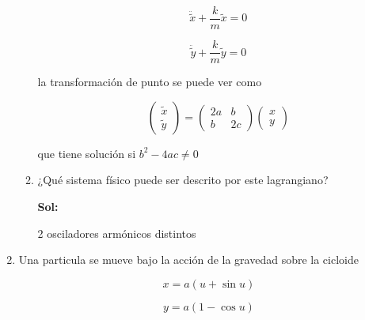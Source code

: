 \documentclass[12pt,a4paper]{article}
\begin{document}
\begin{enumerate}
\begin{enumerate}
    \begin{equation*}
        \ddot{\tilde{x}} + \frac{k}{m} \tilde{x} = 0
    \end{equation*}
    
    \begin{equation*}
        \ddot{\tilde{y}} + \frac{k}{m} \tilde{y} = 0
    \end{equation*}
    
    la transformación de punto se puede ver como
    
    \begin{equation*}
        \left(\begin{matrix}
        \tilde{x} \\
        \tilde{y}
        \end{matrix}\right) =
        \left(\begin{matrix}
        2a & b \\
        b & 2c
        \end{matrix}\right)
        \left(\begin{matrix}
        x \\
        y
        \end{matrix}\right)
    \end{equation*}
    
    que tiene solución si $b^2 - 4ac \neq 0 $
    

    
    
    
    \item ¿Qué sistema físico puede ser descrito por este lagrangiano?
    
    \textbf{Sol:}
    
     2 osciladores armónicos distintos
    
    
    
    
\end{enumerate}






\item Una particula se mueve bajo la acción de la gravedad sobre la cicloide

\begin{equation*}
    x = a( u + \sin{u})
\end{equation*}

\begin{equation*}
    y = a (1 - \cos{u})
\end{equation*}


\end{enumerate}
\end{document}
